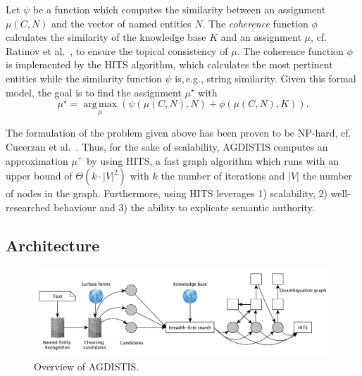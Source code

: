 \documentclass{llncs}
\begin{document}
Let $\psi$ be a function which computes the similarity between an assignment $\mu(C,N)$ and the vector of named entities $N$.
The \emph{coherence} function $\phi$ calculates the similarity of the knowledge base $K$ and an assignment $\mu$, cf. Ratinov et al.~\cite{rat:rot}, to ensure the topical consistency of $\mu$.
The coherence function $\phi$ is implemented by the HITS algorithm, which calculates the most pertinent entities while the similarity function $\psi$ is,\,e.g., string similarity.
Given this formal model, the goal is to find the assignment $\mu^\star$ with
\begin{equation*}
\mu^\star= \operatorname*{arg\,max}\limits_{\mu}\left(\psi(\mu(C,N), N) + \phi(\mu(C,N),K)\right).
\end{equation*}

The formulation of the problem given above has been proven to be NP-hard, cf. Cucerzan et al.~\cite{Cucerzan07}.
Thus, for the sake of scalability, AGDISTIS computes an approximation $\mu^{+}$ by using HITS, a fast graph algorithm which runs with an upper bound of $\Theta(k\cdot |V|^2)$ with $k$ the number of iterations and $|V|$ the number of nodes in the graph.
Furthermore, using HITS leverages 1) scalability, 2) well-researched behaviour and 3) the ability to explicate semantic authority. 

\subsection{Architecture}
\begin{figure}[h!tb]
\centering
\includegraphics[width=\linewidth]{fig/overview.pdf}
\caption{Overview of AGDISTIS.}
\label{overview}
\end{figure}
\end{document}
